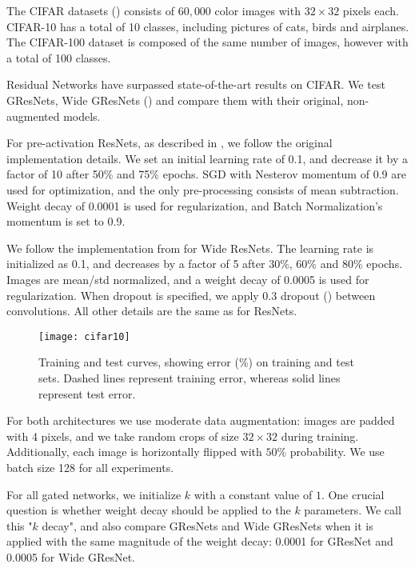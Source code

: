\documentclass{article} %
\begin{document}
The CIFAR datasets (\cite{cifar}) consists of $60,000$ color images with $32 \times 32$ pixels each. CIFAR-10 has a total of 10 classes, including pictures of cats, birds and airplanes. The CIFAR-100 dataset is composed of the same number of images, however with a total of 100 classes.

Residual Networks have surpassed state-of-the-art results on CIFAR. We test GResNets, Wide GResNets (\cite{wide}) and compare them with their original, non-augmented models.

For pre-activation ResNets, as described in \cite{resnet2}, we follow the original implementation details. We set an initial learning rate of 0.1, and decrease it by a factor of 10 after 50\% and 75\% epochs. SGD with Nesterov momentum of 0.9 are used for optimization, and the only pre-processing consists of mean subtraction. Weight decay of 0.0001 is used for regularization, and Batch Normalization's momentum is set to 0.9.

We follow the implementation from \cite{wide} for Wide ResNets. The learning rate is initialized as 0.1, and decreases by a factor of 5 after 30\%, 60\% and 80\% epochs. Images are mean/std normalized, and a weight decay of 0.0005 is used for regularization. When dropout is specified, we apply 0.3 dropout (\cite{dropout}) between convolutions. All other details are the same as for ResNets.

\begin{figure}[!ht]
  \centering
    \texttt{[image: cifar10]}
  \caption{Training and test curves, showing error (\%) on training and test sets. Dashed lines represent training error, whereas solid lines represent test error.}
\label{cifar}
\end{figure}

For both architectures we use moderate data augmentation: images are padded with 4 pixels, and we take random  crops of size $32 \times 32$ during training. Additionally, each image is horizontally flipped with  $50\%$  probability. We use batch size 128 for all experiments.

For all gated networks, we initialize $k$ with a constant value of $1$. One crucial question is whether weight decay should be applied to the $k$ parameters. We call this "$k$ decay", and also compare GResNets and Wide GResNets when it is applied with the same magnitude of the weight decay: 0.0001 for GResNet and 0.0005 for Wide GResNet.
\end{document}
